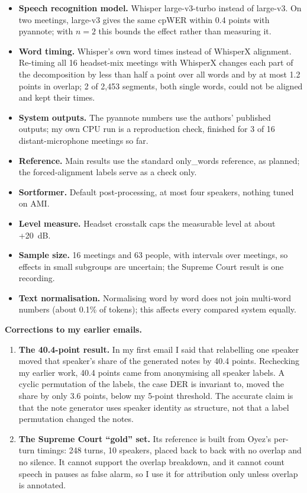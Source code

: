 \documentclass[11pt,a4paper]{article}
\begin{document}
\begin{itemize}[leftmargin=*]
  \item \textbf{Speech recognition model.} Whisper large-v3-turbo instead of large-v3. On two meetings, large-v3 gives the same cpWER within 0.4 points with pyannote; with $n = 2$ this bounds the effect rather than measuring it.
  \item \textbf{Word timing.} Whisper's own word times instead of WhisperX alignment. Re-timing all 16 headset-mix meetings with WhisperX changes each part of the decomposition by less than half a point over all words and by at most 1.2 points in overlap; 2 of 2,453 segments, both single words, could not be aligned and kept their times.
  \item \textbf{System outputs.} The pyannote numbers use the authors' published outputs; my own CPU run is a reproduction check, finished for 3 of 16 distant-microphone meetings so far.
  \item \textbf{Reference.} Main results use the standard only\_words reference, as planned; the forced-alignment labels serve as a check only.
  \item \textbf{Sortformer.} Default post-processing, at most four speakers, nothing tuned on AMI.
  \item \textbf{Level measure.} Headset crosstalk caps the measurable level at about +20~dB.
  \item \textbf{Sample size.} 16 meetings and 63 people, with intervals over meetings, so effects in small subgroups are uncertain; the Supreme Court result is one recording.
  \item \textbf{Text normalisation.} Normalising word by word does not join multi-word numbers (about 0.1\% of tokens); this affects every compared system equally.
\end{itemize}

\textbf{Corrections to my earlier emails.}
\begin{enumerate}[leftmargin=*, label=\arabic*.]
  \item \textbf{The 40.4-point result.} In my first email I said that relabelling one speaker moved that speaker's share of the generated notes by 40.4 points. Rechecking my earlier work, 40.4 points came from anonymising all speaker labels. A cyclic permutation of the labels, the case DER is invariant to, moved the share by only 3.6 points, below my 5-point threshold. The accurate claim is that the note generator uses speaker identity as structure, not that a label permutation changed the notes.
  \item \textbf{The Supreme Court ``gold'' set.} Its reference is built from Oyez's per-turn timings: 248 turns, 10 speakers, placed back to back with no overlap and no silence. It cannot support the overlap breakdown, and it cannot count speech in pauses as false alarm, so I use it for attribution only unless overlap is annotated.
\end{enumerate}
\end{document}
